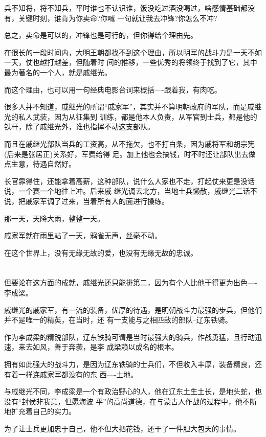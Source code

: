 \documentclass[11pt,a4paper,onecolumn]{article}
\begin{document}
兵不知将，将不知兵，平时谁也不认识谁，饭没吃过酒没喝过，啥感情基础都没有，关键时刻，谁肯为你卖命?你喊
一句就让我去冲锋?你怎么不冲?

总之，卖命是可以的，冲锋也是可行的，但你得给个理由先。

在很长的一段时间内，大明王朝都找不到这个理由，所以明军的战斗力是一天不如一天，仗也越打越差，但随着时
间的推移，一些优秀的将领终于找到了它，其中最为著名的一个人，就是戚继光。

而这个理由，也可以用一句经典电影台词来概括----跟着我，有肉吃。

很多人并不知道，戚继光的所谓``戚家军''，其实并不算明朝政府的军队，而是戚继光的私人武装，因为从征集到
训练，都是他本人负责，从军官到士兵，都是他的铁杆，除了戚继光外，谁也指挥不动这支部队。

而且在戚继光部队当兵的工资高，从不拖欠，也不打白条，因为戚将军和胡宗宪(后来是张居正)关系好，军费给得
足。加上他也会搞钱，时不时还让部队出去做点生意，待遇自然好。

长官靠得住，还能拿着高薪，这种部队，说什么人家也不走，打起仗来更是没话说，一个赛一个地往上冲。后来戚
继光调去北方，当地士兵懒散，戚继光二话不说，把戚家军调了过来，当着所有人的面进行操练。

那一天，天降大雨，整整一天。

戚家军就在雨里站了一天，鸦雀无声，丝毫不动。

在这个世界上，没有无缘无故的爱，也没有无缘无故的忠诚。

\section[\thesection]{}

但要论在这方面的成就，戚继光还只能排第二，因为有个人比他干得更为出色----李成梁。

戚继光的戚家军，有一流的装备，优厚的待遇，是明朝战斗力最强的步兵，但他们并不是唯一的精英，在当时，还
有一支能与之相匹敌的部队--辽东铁骑。

作为李成梁的精锐部队，辽东铁骑可谓是当时最强大的骑兵，作战勇猛，且行动迅速，来去如风，善于奔袭，是李
成梁赖以成名的根本。

拥有如此强大的战斗力，是因为辽东铁骑的士兵们，不但收入丰厚，装备精良，还有着一样连戚家军都没有的东
西----土地。

与戚继光不同，李成梁是一个有政治野心的人，他在辽东土生土长，是地头蛇，也没有``封侯非我意，但愿海波
平''的高尚道德，在与蒙古人作战的过程中，他不断地扩充着自己的实力。

为了让士兵更加忠于自己，他不但大把花钱，还干了一件胆大包天的事情。
\end{document}
